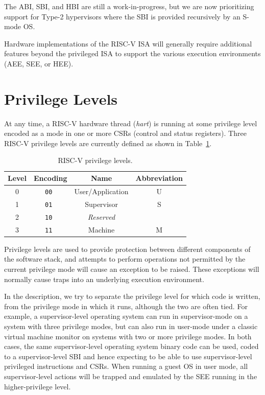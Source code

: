 \begin{commentary}
The ABI, SBI, and HBI are still a work-in-progress, but we are now
prioritizing support for Type-2 hypervisors where the SBI is provided
recursively by an S-mode OS.
\end{commentary}

Hardware implementations of the RISC-V ISA will generally require
additional features beyond the privileged ISA to support the various
execution environments (AEE, SEE, or HEE).

\section{Privilege Levels}

At any time, a RISC-V hardware thread ({\em hart}) is running at some
privilege level encoded as a mode in one or more CSRs (control and
status registers).  Three RISC-V privilege levels are currently defined
as shown in Table~\ref{privlevels}.

\begin{table}[h!]
\begin{center}
\begin{tabular}{|c|c|c|c|}
  \hline
   Level & Encoding & Name      & Abbreviation \\ \hline  
   0     & \tt 00   & User/Application & U     \\ 
   1     & \tt 01   & Supervisor & S           \\ 
   2     & \tt 10   & {\em Reserved} &            \\ 
   3     & \tt 11   & Machine    & M           \\ 
  \hline
 \end{tabular}
\end{center}
\caption{RISC-V privilege levels.}
\label{privlevels}
\end{table}

Privilege levels are used to provide protection between different
components of the software stack, and attempts to perform operations
not permitted by the current privilege mode will cause an exception to
be raised.  These exceptions will normally cause traps into an
underlying execution environment.

\begin{commentary}
In the description, we try to separate the privilege level for which
code is written, from the privilege mode in which it runs, although
the two are often tied.  For example, a supervisor-level operating
system can run in supervisor-mode on a system with three privilege
modes, but can also run in user-mode under a classic virtual machine
monitor on systems with two or more privilege modes.  In both cases,
the same supervisor-level operating system binary code can be used,
coded to a supervisor-level SBI and hence expecting to be able to use
supervisor-level privileged instructions and CSRs.  When running a
guest OS in user mode, all supervisor-level actions will be trapped
and emulated by the SEE running in the higher-privilege level.
\end{commentary}

